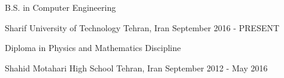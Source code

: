 \begin{cventries}
  \cventry
    {
        \begin{cvitems}
            B.S. in Computer Engineering
        \end{cvitems}
    }
    {Sharif University of Technology}
    {Tehran, Iran}
    {September 2016 - PRESENT}
    {}
\end{cventries}
\begin{cventries}
  \cventry
    {
        \begin{cvitems}
            Diploma in Physics and Mathematics Discipline
        \end{cvitems}
    }
    {Shahid Motahari High School}
    {Tehran, Iran}
    {September 2012 - May 2016}
    {}
\end{cventries}


